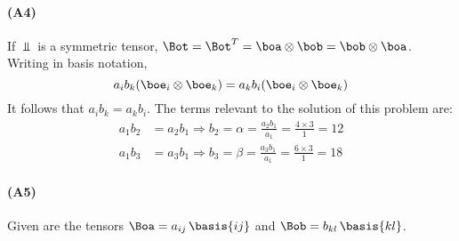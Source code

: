 \documentclass[a4paper,twosided,11pt,DIV15]{scrartcl}
\begin{document}
\paragraph{(A4)} If $\Bot$ is a symmetric tensor, $\Bot=\Bot^T=\boa
\otimes \bob = \bob \otimes \boa$. Writing in basis notation,
$$a_ib_k(\boe_i\otimes\boe_k) = a_kb_i(\boe_i\otimes\boe_k)$$
It follows that $a_ib_k=a_kb_i$. The terms relevant to the solution of
this problem are:
\begin{align*}
  a_1b_2 &= a_2b_1 \Rightarrow b_2=\alpha=\frac{a_2b_1}{a_1} =
  \frac{4\times 3}{1} = 12\\
  a_1b_3 &= a_3b_1 \Rightarrow b_3=\beta=\frac{a_3b_1}{a_1} =
  \frac{6\times 3}{1} = 18
\end{align*}

\paragraph{(A5)} Given are the tensors $\Boa=a_{ij}\,\basis{ij}$ and
$\Bob=b_{kl}\,\basis{kl}$.
\end{document}
